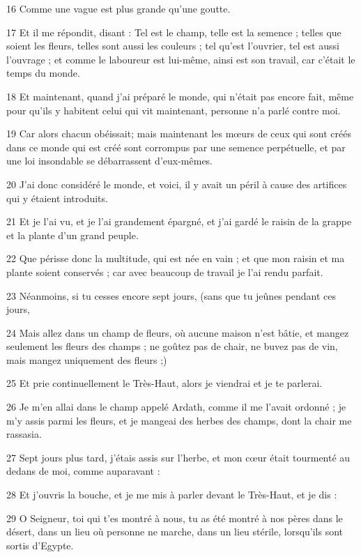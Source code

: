 \par 16 Comme une vague est plus grande qu'une goutte.
\par 17 Et il me répondit, disant : Tel est le champ, telle est la semence ; telles que soient les fleurs, telles sont aussi les couleurs ; tel qu'est l'ouvrier, tel est aussi l'ouvrage ; et comme le laboureur est lui-même, ainsi est son travail, car c'était le temps du monde.
\par 18 Et maintenant, quand j'ai préparé le monde, qui n'était pas encore fait, même pour qu'ils y habitent celui qui vit maintenant, personne n'a parlé contre moi.
\par 19 Car alors chacun obéissait; mais maintenant les mœurs de ceux qui sont créés dans ce monde qui est créé sont corrompus par une semence perpétuelle, et par une loi insondable se débarrassent d'eux-mêmes.
\par 20 J'ai donc considéré le monde, et voici, il y avait un péril à cause des artifices qui y étaient introduits.
\par 21 Et je l'ai vu, et je l'ai grandement épargné, et j'ai gardé le raisin de la grappe et la plante d'un grand peuple.
\par 22 Que périsse donc la multitude, qui est née en vain ; et que mon raisin et ma plante soient conservés ; car avec beaucoup de travail je l'ai rendu parfait.
\par 23 Néanmoins, si tu cesses encore sept jours, (sans que tu jeûnes pendant ces jours,
\par 24 Mais allez dans un champ de fleurs, où aucune maison n'est bâtie, et mangez seulement les fleurs des champs ; ne goûtez pas de chair, ne buvez pas de vin, mais mangez uniquement des fleurs ;)
\par 25 Et prie continuellement le Très-Haut, alors je viendrai et je te parlerai.
\par 26 Je m'en allai dans le champ appelé Ardath, comme il me l'avait ordonné ; je m'y assis parmi les fleurs, et je mangeai des herbes des champs, dont la chair me rassasia.
\par 27 Sept jours plus tard, j'étais assis sur l'herbe, et mon cœur était tourmenté au dedans de moi, comme auparavant :
\par 28 Et j'ouvris la bouche, et je me mis à parler devant le Très-Haut, et je dis :
\par 29 O Seigneur, toi qui t'es montré à nous, tu as été montré à nos pères dans le désert, dans un lieu où personne ne marche, dans un lieu stérile, lorsqu'ils sont sortis d'Egypte.
